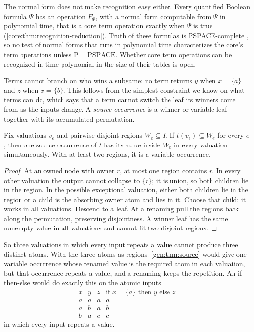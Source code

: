 The normal form does not make recognition easy either. Every quantified Boolean formula $\Psi$ has an operation $F_\Psi$, with a normal form computable from $\Psi$ in polynomial time, that is a core term operation exactly when $\Psi$ is true (\cref{core:thm:recognition-reduction}). Truth of these formulas is PSPACE-complete \cite{StockmeyerMeyer1973}, so no test of normal forms that runs in polynomial time characterizes the core's term operations unless $\mathrm P=\mathrm{PSPACE}$. Whether core term operations can be recognized in time polynomial in the size of their tables is open.

Terms cannot branch on who wins a subgame: no term returns $y$ when $x=\{a\}$ and $z$ when $x=\{b\}$. This follows from the simplest constraint we know on what terms can do, which says that a term cannot switch the leaf its winners come from as the inputs change. A \emph{source occurrence} is a winner or variable leaf together with its accumulated permutation.

\begin{theorem}\label{gen:thm:source}
Fix valuations $v_e$ and pairwise disjoint regions $W_e\subseteq I$. If $t(v_e)\subseteq W_e$ for every $e$, then one source occurrence of $t$ has its value inside $W_e$ in every valuation simultaneously. With at least two regions, it is a variable occurrence.
\end{theorem}
\begin{proof}
At an owned node with owner $r$, at most one region contains $r$.
In every other valuation the output cannot collapse to $\{r\}$;
it is union, so both children lie in the region. In the possible
exceptional valuation, either both children lie in the region or a
child is the absorbing owner atom and lies in it. Choose that child:
it works in all valuations. Descend to a leaf. At a renaming pull the
regions back along the permutation, preserving disjointness. A winner
leaf has the same nonempty value in all valuations and cannot fit
two disjoint regions.
\end{proof}

So three valuations in which every input repeats a value cannot produce three distinct atoms. With the three atoms as regions, \cref{gen:thm:source} would give one variable occurrence whose renamed value is the required atom in each valuation, but that occurrence repeats a value, and a renaming keeps the repetition. An if-then-else would do exactly this on the atomic inputs
\[
 \begin{array}{ccc|c}
 x&y&z&\text{if }x=\{a\}\text{ then }y\text{ else }z\\\hline
 a&a&a&a\\
 a&b&a&b\\
 b&a&c&c
 \end{array}
\]
in which every input repeats a value.

